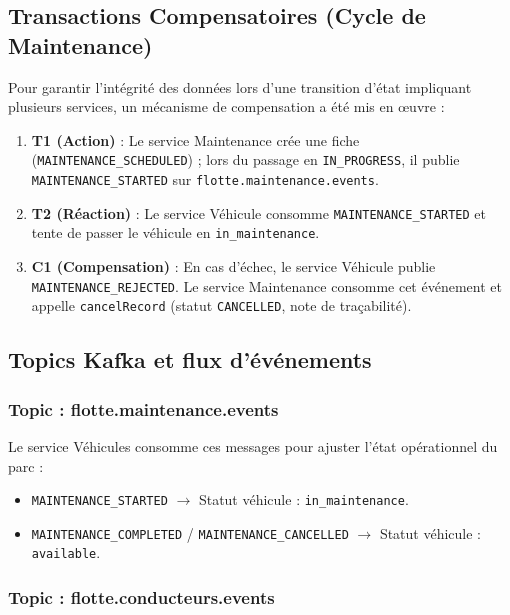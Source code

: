 \documentclass[12pt,a4paper]{article}
\begin{document}
\subsection{Transactions Compensatoires (Cycle de Maintenance)}

Pour garantir l'intégrité des données lors d'une transition d'état impliquant plusieurs services, un mécanisme de compensation a été mis en œuvre :

\begin{enumerate}
    \item \textbf{T1 (Action)} : Le service Maintenance crée une fiche (\texttt{MAINTENANCE\_SCHEDULED}) ; lors du passage en \texttt{IN\_PROGRESS}, il publie \texttt{MAINTENANCE\_STARTED} sur \texttt{flotte.maintenance.events}.
    \item \textbf{T2 (Réaction)} : Le service Véhicule consomme \texttt{MAINTENANCE\_STARTED} et tente de passer le véhicule en \texttt{in\_maintenance}.
    \item \textbf{C1 (Compensation)} : En cas d'échec, le service Véhicule publie \texttt{MAINTENANCE\_REJECTED}. Le service Maintenance consomme cet événement et appelle \texttt{cancelRecord} (statut \texttt{CANCELLED}, note de traçabilité).
\end{enumerate}

\subsection{Topics Kafka et flux d'événements}

\subsubsection{Topic : flotte.maintenance.events}

Le service Véhicules consomme ces messages pour ajuster l'état opérationnel du parc :
\begin{itemize}
    \item \texttt{MAINTENANCE\_STARTED} $\rightarrow$ Statut véhicule : \texttt{in\_maintenance}.
    \item \texttt{MAINTENANCE\_COMPLETED} / \texttt{MAINTENANCE\_CANCELLED} $\rightarrow$ Statut véhicule : \texttt{available}.
\end{itemize}

\subsubsection{Topic : flotte.conducteurs.events}
\end{document}
